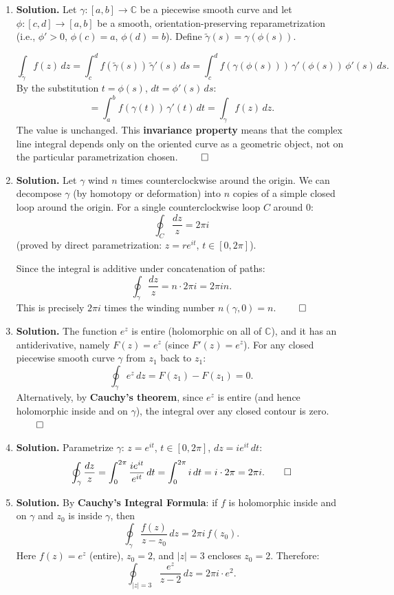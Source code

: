 \begin{enumerate}
\item \textbf{Solution.}
Let $\gamma: [a,b] \to \mathbb{C}$ be a piecewise smooth curve and let $\phi: [c,d] \to [a,b]$ be a smooth, orientation-preserving reparametrization (i.e., $\phi' > 0$, $\phi(c) = a$, $\phi(d) = b$). Define $\tilde{\gamma}(s) = \gamma(\phi(s))$.

\[
\int_{\tilde{\gamma}} f(z)\,dz = \int_c^d f(\tilde{\gamma}(s))\,\tilde{\gamma}'(s)\,ds = \int_c^d f(\gamma(\phi(s)))\,\gamma'(\phi(s))\,\phi'(s)\,ds.
\]
By the substitution $t = \phi(s)$, $dt = \phi'(s)\,ds$:
\[
= \int_a^b f(\gamma(t))\,\gamma'(t)\,dt = \int_\gamma f(z)\,dz.
\]
The value is unchanged. This \textbf{invariance property} means that the complex line integral depends only on the oriented curve as a geometric object, not on the particular parametrization chosen. $\qed$

\item \textbf{Solution.}
Let $\gamma$ wind $n$ times counterclockwise around the origin. We can decompose $\gamma$ (by homotopy or deformation) into $n$ copies of a simple closed loop around the origin. For a single counterclockwise loop $C$ around $0$:
\[
\oint_C \frac{dz}{z} = 2\pi i
\]
(proved by direct parametrization: $z = re^{it}$, $t \in [0,2\pi]$).

Since the integral is additive under concatenation of paths:
\[
\oint_\gamma \frac{dz}{z} = n \cdot 2\pi i = 2\pi i n.
\]
This is precisely $2\pi i$ times the winding number $n(\gamma, 0) = n$. $\qed$

\item \textbf{Solution.}
The function $e^z$ is entire (holomorphic on all of $\mathbb{C}$), and it has an antiderivative, namely $F(z) = e^z$ (since $F'(z) = e^z$). For any closed piecewise smooth curve $\gamma$ from $z_1$ back to $z_1$:
\[
\oint_\gamma e^z\,dz = F(z_1) - F(z_1) = 0.
\]
Alternatively, by \textbf{Cauchy's theorem}, since $e^z$ is entire (and hence holomorphic inside and on $\gamma$), the integral over any closed contour is zero. $\qed$

\item \textbf{Solution.}
Parametrize $\gamma$: $z = e^{it}$, $t \in [0,2\pi]$, $dz = ie^{it}\,dt$:
\[
\oint_\gamma \frac{dz}{z} = \int_0^{2\pi} \frac{ie^{it}}{e^{it}}\,dt = \int_0^{2\pi} i\,dt = i \cdot 2\pi = 2\pi i. \qed
\]

\item \textbf{Solution.}
By \textbf{Cauchy's Integral Formula}: if $f$ is holomorphic inside and on $\gamma$ and $z_0$ is inside $\gamma$, then
\[
\oint_\gamma \frac{f(z)}{z - z_0}\,dz = 2\pi i\, f(z_0).
\]
Here $f(z) = e^z$ (entire), $z_0 = 2$, and $|z| = 3$ encloses $z_0 = 2$. Therefore:
\[
\oint_{|z|=3} \frac{e^z}{z-2}\,dz = 2\pi i \cdot e^2.
\]


\end{enumerate}
